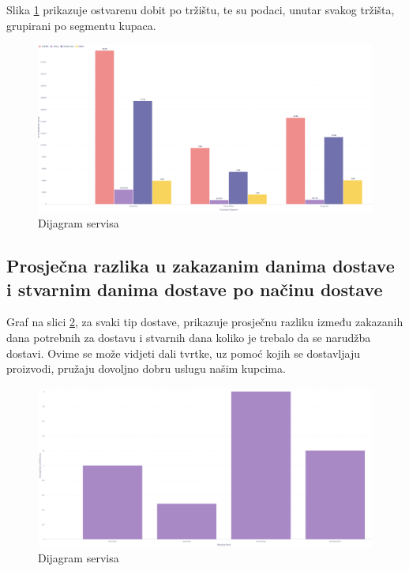 \documentclass[12pt, oneside]{book}
\begin{document}
Slika \ref{ProfitSegment} prikazuje ostvarenu dobit po tržištu, te su podaci, unutar svakog tržišta, grupirani po segmentu kupaca.

\begin{figure}[H]
\label{ProfitSegment}
\includegraphics[width=16cm]{images/Metabase-ProfitSegment.png}
\centering
\caption{Dijagram servisa}
\end{figure}


\subsection{Prosječna razlika u zakazanim danima dostave i stvarnim danima dostave po načinu dostave}
Graf na slici \ref{ShippingDiff}, za svaki tip dostave, prikazuje prosječnu razliku između zakazanih dana potrebnih za dostavu i stvarnih dana koliko je trebalo da se narudžba dostavi. Ovime se može vidjeti dali tvrtke, uz pomoć kojih se dostavljaju proizvodi, pružaju dovoljno dobru uslugu našim kupcima.   

\begin{figure}[H]
\label{ShippingDiff}
\includegraphics[width=16cm]{images/Metabase-ShippingDiff.png}
\centering
\caption{Dijagram servisa}
\end{figure}
\end{document}
